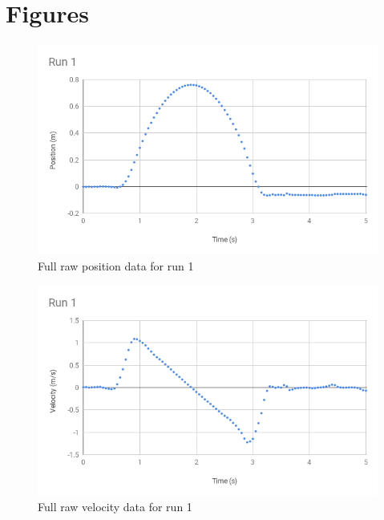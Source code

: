 \section{Figures}
\begin{figure}[ht]
    \centering
    \includegraphics[scale=0.71]{image/02-incline/Run1-d.png}
    \caption{Full raw position data for run 1}
    \label{figure:02.raw.d}
\end{figure}
\begin{figure}[ht]
    \centering
    \includegraphics[scale=0.71]{image/02-incline/Run1-v.png}
    \caption{Full raw velocity data for run 1}
    \label{figure:02.raw.v}
\end{figure}
